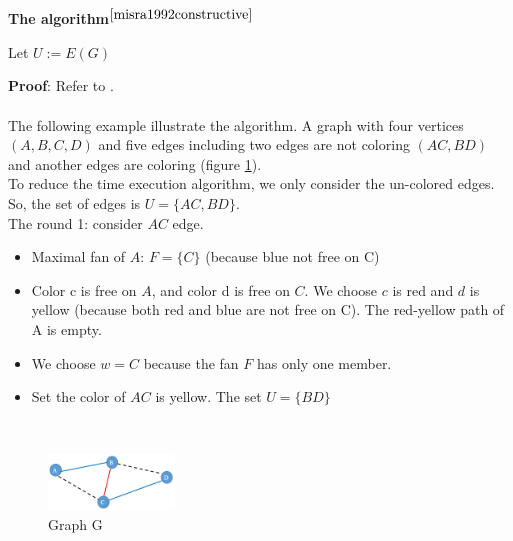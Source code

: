 \textbf{The algorithm}$^{\cite{misra1992constructive}}$~\\
\begin{algorithm}[H]
Let $U:=E(G)$\\
\end{algorithm}
\textbf{Proof}: Refer to \cite{berge1991short}.\\\\
The following example illustrate the algorithm. A graph with four vertices $(A, B, C, D)$ and five edges including two edges are not coloring $(AC, BD)$ and another edges are coloring (figure \ref{fig:graph_ex1}).\\
To reduce the time execution algorithm, we only consider the un-colored edges. So, the set of edges is $U=\{AC, BD\}$.\\
The round 1: consider $AC$ edge.
\begin{itemize}
\item Maximal fan of $A$: $F=\{C\}$ (because blue not free on C)
\item Color c is free on $A$, and color d is free on $C$. We choose $ c $ is red and $ d $ is yellow (because both red and blue are not free on C). The red-yellow path of A is empty.
\item We choose $w = C$ because the fan $F$ has only one member. 
\item Set the color of $AC$ is yellow. The set $U=\{BD\}$
\end{itemize}~\\
\begin{figure}[h!]
\centering
\includegraphics[width=0.3\textwidth]{./images/graph_ex1}
\caption{Graph G }
\label{fig:graph_ex1}
\end{figure}~\\

